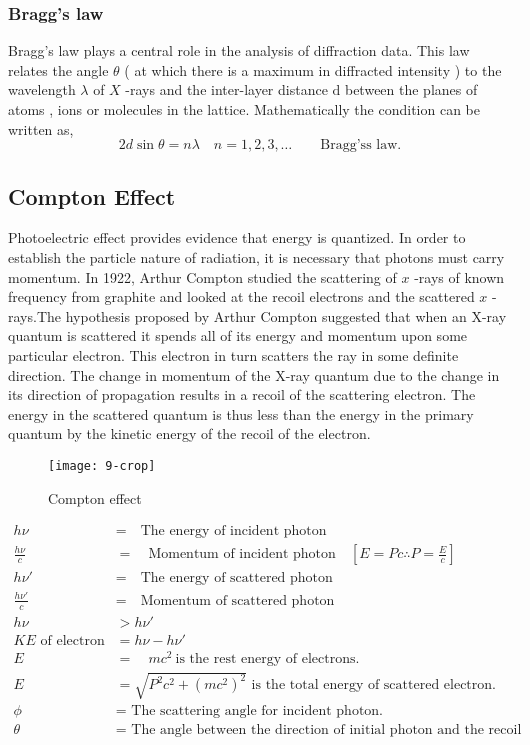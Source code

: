 \subsubsection{Bragg's law}
Bragg's  law plays a central role in  the analysis of diffraction data. This law relates the angle $\theta$ ( at which there is a maximum in diffracted intensity ) to the wavelength $\lambda$ of $X$ -rays and the inter-layer distance $\mathrm{d}$ between the planes of atoms , ions or molecules in the lattice. 
Mathematically the condition can be  written as,
\begin{equation}
2 d \sin \theta=n \lambda \quad n=1,2,3, \ldots
\qquad \text{Bragg'ss law.}
\end{equation}

\subsection{Compton Effect}
Photoelectric effect provides evidence that energy is quantized. In order to establish the particle nature of radiation, it is necessary that photons must carry momentum.  In 1922, Arthur Compton studied the scattering of $x$ -rays of known frequency from graphite and looked at the recoil electrons and the scattered $x$ -rays.The hypothesis proposed by Arthur Compton  suggested that when an X-ray quantum is scattered it spends all of its energy and momentum upon some particular electron. This electron in turn scatters the ray in some definite direction. The change in momentum of the X-ray quantum due to the change in its direction of propagation results in a recoil of the scattering electron. The energy in the scattered quantum is thus less than the energy in the primary quantum by the kinetic energy of the recoil of the electron.
\begin{figure}[H]
	\centering
	\texttt{[image: 9-crop]}
	\caption{Compton effect}
	\label{}
\end{figure}
\begin{align*}
h\nu&=\quad \text{The energy of incident photon}\\
\frac{h\nu}{c}&=\quad \text{Momentum of incident photon}\quad [E=Pc \therefore P=\frac{E}{c}]\\
h\nu\prime&=\quad\text{The energy of scattered photon}\\
\frac{h\nu\prime}{c}&=\quad \text{Momentum of scattered photon}\\
h\nu&>h\nu\prime\\
KE \text{ of electron }&=h\nu-h\nu\prime\\
E&=\quad mc^2 \ \text{is the rest energy of electrons. }\\
E&=\sqrt{P^2c^2+(mc^2)^2}\text{ is the total energy of scattered electron.}\\
\phi&=\text{ The scattering angle for incident photon.}\\
\theta&= \text{ The angle between the direction of initial photon and the recoil electron.}
\end{align*}
